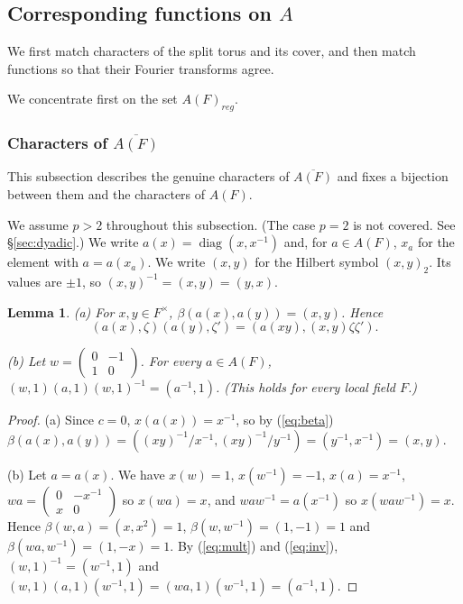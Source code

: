 \documentclass[12pt,letterpaper]{book}
\theoremstyle{plain}
\newtheorem{lemma}[theorem]{Lemma}
\theoremstyle{definition}
\theoremstyle{remark}
\theoremstyle{remark}
\begin{document}
\subsection{Corresponding functions on \texorpdfstring{$A$}{A}}

We first match characters of the split torus and its cover, and then match functions so that their Fourier transforms agree.


We concentrate first on the set $A(F)_{reg}$.

\subsubsection{Characters of \texorpdfstring{$\overline{A(F)}$}{A(F)-bar}}\label{sec:charsA}

This subsection describes the genuine characters of $\overline{A(F)}$ and fixes a bijection between them and the characters of $A(F)$.


We assume $p>2$ throughout this subsection. (The case $p=2$ is
not covered. See \S\ref{sec:dyadic}.) We write $a(x)=\operatorname{diag}(x,x^{-1})$
and, for $a\in A(F)$, $x_a$ for the element with $a=a(x_a)$. We write
$(x,y)$ for the Hilbert symbol $(x,y)_2$. Its values are $\pm1$, so
$(x,y)^{-1}=(x,y)=(y,x)$.

\begin{lemma}\label{lem:Acocycle}
(a) For $x,y\in F^\times$, $\beta(a(x),a(y))=(x,y)$. Hence
\[
(a(x),\zeta)(a(y),\zeta')=(a(xy),(x,y)\zeta\zeta').
\]

(b) Let $w=\left(\begin{smallmatrix}0&-1\\1&0\end{smallmatrix}\right)$.
For every $a\in A(F)$, $(w,1)(a,1)(w,1)^{-1}=(a^{-1},1)$.
(This holds for every local field $F$.)
\end{lemma}

\begin{proof}
(a) Since $c=0$, $x(a(x))=x^{-1}$, so by (\ref{eq:beta})
$\beta(a(x),a(y))=((xy)^{-1}/x^{-1},(xy)^{-1}/y^{-1})=(y^{-1},x^{-1})=(x,y)$.

(b) Let $a=a(x)$. We have $x(w)=1$, $x(w^{-1})=-1$, $x(a)=x^{-1}$,
$wa=\left(\begin{smallmatrix}0&-x^{-1}\\x&0\end{smallmatrix}\right)$ so
$x(wa)=x$, and $waw^{-1}=a(x^{-1})$ so $x(waw^{-1})=x$. Hence
$\beta(w,a)=(x,x^2)=1$, $\beta(w,w^{-1})=(1,-1)=1$ and
$\beta(wa,w^{-1})=(1,-x)=1$. By (\ref{eq:mult}) and (\ref{eq:inv}),
$(w,1)^{-1}=(w^{-1},1)$ and
$(w,1)(a,1)(w^{-1},1)=(wa,1)(w^{-1},1)=(a^{-1},1)$.
\end{proof}
\end{document}
